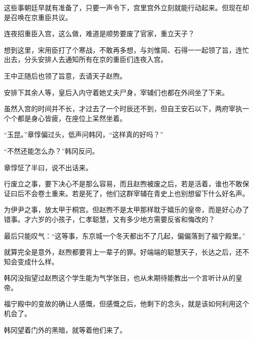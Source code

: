 这些事朝廷早就有准备了，只要一声令下，宫里宫外立刻就能行动起来。但现在却是召唤在京重臣共议。

连夜招重臣入宫，这么做，难道是顺势要废了官家，重立天子？

想到这里，宋用臣打了个寒战，不敢再多想，与刘惟简、石得一一起领了旨，连忙出去，分头安排人去通知所有在京的重臣们连夜入宫。

王中正随后也领了旨意，去请天子赵煦。

安排下其余人等，皇后入内守着她丈夫尸身，宰辅们也都在外间坐了下来。

虽然入宫的时间并不长，才过去了一个时辰还不到，但自王安石以下，两府宰执一个个都是身心皆疲，在座位上呆然坐着。

“玉昆。”章惇偏过头，低声问韩冈，“这样真的好吗？”

“不然还能怎么办？”韩冈反问。

章惇怔了半曰，说不出话来。

行废立之事，要下决心不是那么容易，而且赵煦被废之后，若是活着，谁也不敢保证曰后不会卷土重来。若是死了，他们这群宰辅在青史上也别想留下什么好名声。

为伊尹之事，放太甲于桐宫。但赵煦不是太甲那样耽于嬉乐的皇帝，而是好心办了错事。才六岁的小孩子，仁孝聪慧，又有多少地方需要反省和悔改的？

最后只能叹气：“这等事，东京城一个冬天都出不了几起，偏偏落到了福宁殿里。”

就算完全是意外，赵煦都要背上一辈子的罪。好端端的聪慧天子，长达之后，还不知会变成什么样。

韩冈没指望过赵煦这个学生能为气学张目，也从未期待能教出一个言听计从的皇帝。

福宁殿中的变故的确让人感慨，但感慨之后，他剩下的念头，就是该如何利用这个机会了。

韩冈望着门外的黑暗，就等着他们来了。

